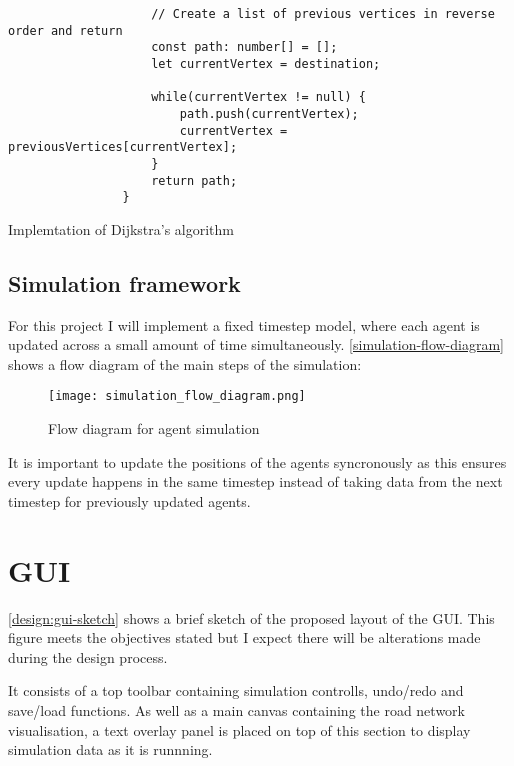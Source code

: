 \begin{listing}
\begin{verbatim}
                    // Create a list of previous vertices in reverse order and return
                    const path: number[] = [];
                    let currentVertex = destination;

                    while(currentVertex != null) {
                        path.push(currentVertex);
                        currentVertex = previousVertices[currentVertex];
                    }
                    return path;
                }
            \end{verbatim}
            \caption{Implemtation of Dijkstra's algorithm}
            \label{Dijkstra-implementation}
        \end{listing}

    \subsection{Simulation framework}

        For this project I will implement a fixed timestep model, where each agent is updated across a small amount of time simultaneously. \autoref{simulation-flow-diagram} shows a flow diagram of the main steps of the simulation:

        \begin{figure}
            \centering
            \texttt{[image: simulation\_flow\_diagram.png]}
            \caption{Flow diagram for agent simulation}
            \label{simulation-flow-diagram}
        \end{figure}

        It is important to update the positions of the agents syncronously as this ensures every update happens in the same timestep instead of taking data from the next timestep for previously updated agents.

\section{GUI}
\label{design:GUI}

    \autoref{design:gui-sketch} shows a brief sketch of the proposed layout of the GUI. This figure meets the objectives stated but I expect there will be alterations made during the design process.

    It consists of a top toolbar containing simulation controlls, undo/redo and save/load functions. As well as a main canvas containing the road network visualisation, a text overlay panel is placed on top of this section to display simulation data as it is runnning.

